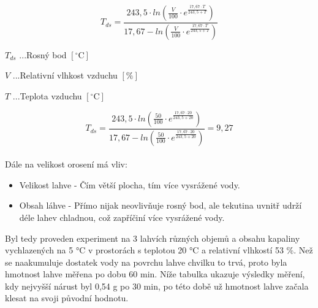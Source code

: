 \begin{equation}
T_{ds} = \frac{243,5 \cdot ln(\frac{V}{100} \cdot e^{\frac{17,67 \cdot T}{243,5 + T}})}{17,67 - ln(\frac{V}{100} \cdot e^{\frac{17,67 \cdot T}{243,5 + T}})}
\label{rosný bod obecne}
\end{equation}

\(T_{ds}\) ...Rosný bod \([\mathrm{^\circ C}]\)

\(V\) ...Relativní vlhkost vzduchu \([\mathrm{\%}]\)

\(T\) ...Teplota vzduchu \([\mathrm{^\circ C}]\)

\begin{equation}
T_{ds} = \frac{243,5 \cdot ln(\frac{50}{100} \cdot e^{\frac{17,67 \cdot 20}{243,5 + 20}})}{17,67 - ln(\frac{50}{100} \cdot e^{\frac{17,67 \cdot 20}{243,5 + 20}})} = 9,27
\label{rosný bod}
\end{equation}
\\
Dále na velikost orosení má vliv:
\begin{itemize}
    \item Velikost lahve - Čím větší plocha, tím více vysrážené vody.
    \item Obsah láhve - Přímo nijak neovlivňuje rosný bod, ale tekutina uvnitř udrží déle lahev chladnou, což zapříčiní více vysrážené vody.
\end{itemize}

Byl tedy proveden experiment na 3 lahvích různých objemů a obsahu kapaliny vychlazených na 5 °C v prostorách s teplotou 20 °C a relativní vlhkostí 53 \%. Než se naakumuluje dostatek vody na povrchu lahve chvilku to trvá, proto byla hmotnost lahve měřena po dobu 60 min. Níže tabulka ukazuje výsledky měření, kdy nejvyšší nárust byl 0,54 g po 30 min, po této době už hmotnost lahve začala klesat na svoji původní hodnotu.


